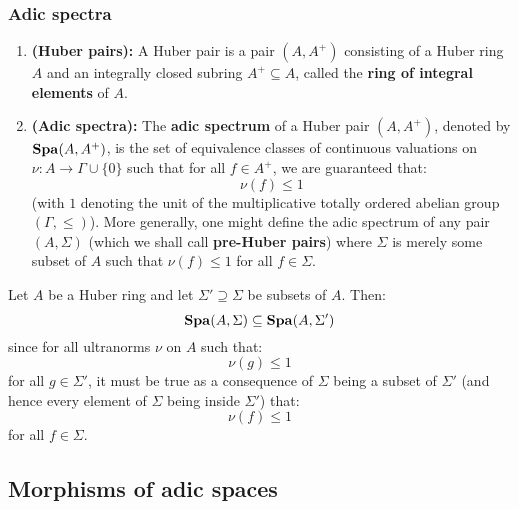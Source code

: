             \subsubsection{Adic spectra}
                \begin{definition} \label{def: adic_spectra}
                    \noindent
                    \begin{enumerate}
                        \item \textbf{(Huber pairs):} A Huber pair is a pair $(A, A^+)$ consisting of a Huber ring $A$ and an integrally closed subring $A^+ \subseteq A$, called the \textbf{ring of integral elements} of $A$.
                        \item \textbf{(Adic spectra):} The \textbf{adic spectrum} of a Huber pair $(A, A^+)$, denoted by $\mathbf{Spa} (A, A^+)$, is the set of equivalence classes of continuous valuations on $\nu: A \to \Gamma \cup \{0\}$ such that for all $f \in A^+$, we are guaranteed that:
                            $$\nu(f) \leq 1$$
                        (with $1$ denoting the unit of the multiplicative totally ordered abelian group $(\Gamma, \leq)$). More generally, one might define the adic spectrum of any pair $(A, \Sigma)$ (which we shall call \textbf{pre-Huber pairs}) where $\Sigma$ is merely some subset of $A$ such that $\nu(f) \leq 1$ for all $f \in \Sigma$. 
                    \end{enumerate}
                \end{definition}
                \begin{remark} \label{remark: adic_spectrum_functoriality}
                    Let $A$ be a Huber ring and let $\Sigma' \supseteq \Sigma$ be subsets of $A$. Then:
                        $$\mathbf{Spa}(A, \Sigma) \subseteq \mathbf{Spa}(A, \Sigma')$$
                    since for all ultranorms $\nu$ on $A$ such that:
                        $$\nu(g) \leq 1$$
                    for all $g \in \Sigma'$, it must be true as a consequence of $\Sigma$ being a subset of $\Sigma'$ (and hence every element of $\Sigma$ being inside $\Sigma'$) that:
                        $$\nu(f) \leq 1$$
                    for all $f \in \Sigma$. 
                \end{remark}
        
        \subsection{Morphisms of adic spaces}
